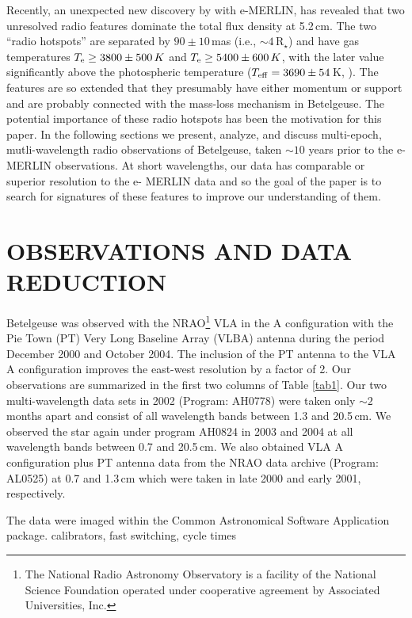 \documentclass[iop]{emulateapj}
\begin{document}
Recently, an unexpected new discovery by \cite{richards_2013} with e-MERLIN, has revealed that two unresolved radio features dominate the total flux density at 5.2\,cm. The two ``radio hotspots'' are separated by $90\pm 10$\,mas (i.e., $\sim 4\,$R$_{\star}$) and have gas temperatures $T_{\rm{e}} \geq 3800\pm 500\,K$ and $T_{\rm{e}} \geq 5400\pm 600\,K$, with the later value significantly above the photospheric temperature ($T_{\rm{eff}}=3690\pm 54\,$K, \citealt{ohnaka_2011}). The features are so extended that they presumably have either momentum or support and are probably connected with the mass-loss mechanism in Betelgeuse. The potential importance of these radio hotspots has been the motivation for this paper. In the following sections we present, analyze, and discuss multi-epoch, mutli-wavelength radio observations of Betelgeuse, taken $\sim 10$ years prior to the e-MERLIN observations. At short wavelengths, our data has comparable or superior resolution to the e- MERLIN data and so the goal of the paper is to search for signatures of these features to improve our understanding of them.

\section{OBSERVATIONS AND DATA REDUCTION}
Betelgeuse was observed with the NRAO\footnote{The National Radio Astronomy Observatory is a facility of
the National Science Foundation operated under cooperative agreement by Associated Universities, Inc.} VLA  in the A configuration with the Pie Town (PT) Very Long Baseline Array (VLBA) antenna during the period December 2000 and October 2004. The inclusion of the PT antenna to the VLA A configuration improves the east-west resolution by a factor of 2. Our observations are summarized in the first two columns of Table \ref{tab1}. Our two multi-wavelength data sets in 2002 (Program: AH0778) were taken only $\sim 2$ months apart and consist of all wavelength bands between 1.3 and 20.5\,cm. We observed the star again under program AH0824 in 2003 and 2004 at all wavelength bands between 0.7 and 20.5\,cm. We also obtained VLA A configuration plus PT antenna data from the NRAO data archive (Program: AL0525) at  0.7 and 1.3\,cm which were taken in late 2000 and early 2001, respectively.

The data were imaged within the Common Astronomical Software Application  \cite[CASA;][]{2007ASPC..376..127M} package. calibrators, fast switching, cycle times
\end{document}
